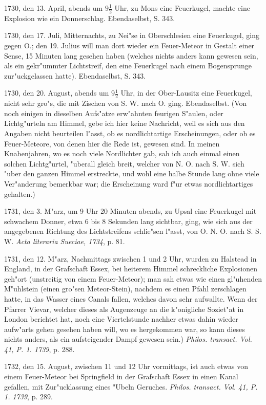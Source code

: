 \documentclass[a4paper, 11pt, oneside, polutonikogreek, german]{article}
\begin{document}
1730, den 13. April, abends um $\mathfrak{9\frac{1}{2}}$ Uhr, zu Mons eine Feuerkugel, machte eine Explosion wie ein Donnerschlag. Ebendaselbst, S. 343.

1730, den 17. Juli, Mitternachts, zu Nei"se in Oberschlesien eine Feuerkugel, ging gegen O.; den 19. Julius will man dort wieder ein Feuer-Meteor in Gestalt einer Sense, 15 Minuten lang gesehen haben (welches nichts anders kann gewesen sein, als ein gekr"ummter Lichtstreif, den eine Feuerkugel nach einem Bogensprunge zur"uckgelassen hatte). Ebendaselbst, S. 343.

1730, den 20. August, abends um $\mathfrak{9\frac{1}{2}}$ Uhr, in der Ober-Lausitz eine Feuerkugel, nicht sehr gro"s, die mit Zischen von S. W. nach O. ging. Ebendaselbst. (Von noch einigen in dieselben Aufs"atze erw"ahnten feurigen S"aulen, oder Lichtg"urteln am Himmel, gebe ich hier keine Nachricht, weil es sich aus den Angaben nicht beurteilen l"asst, ob es nordlichtartige Erscheinungen, oder ob es Feuer-Meteore, von denen hier die Rede ist, gewesen sind. In meinen Knabenjahren, wo es noch viele Nordlichter gab, sah ich auch einmal einen solchen Lichtg"urtel, "uberall gleich breit, welcher von N. O. nach S. W. sich "uber den ganzen Himmel erstreckte, und wohl eine halbe Stunde lang ohne viele Ver"anderung bemerkbar war; die Erscheinung ward f"ur etwas nordlichtartiges gehalten.)

1731, den 3. M"arz, um 9 Uhr 20 Minuten abends, zu Upsal eine Feuerkugel mit schwachem Donner, etwa 6 bis 8 Sekunden lang sichtbar, ging, wie sich aus der angegebenen Richtung des Lichtstreifens schlie"sen l"asst, von O. N. O. nach S. S. W. \emph{Acta literaria Sueciae, 1734}, p. 81.

1731, den 12. M"arz, Nachmittags zwischen 1 und 2 Uhr, wurden zu Halstead in England, in der Grafschaft Essex, bei heiterem Himmel schreckliche Explosionen geh"ort (unstreitig von einem Feuer-Meteor); man sah etwas wie einen gl"uhenden M"uhlstein (einen gro"sen Meteor-Stein), nachdem es einen Pfahl zerschlagen hatte, in das Wasser eines Canals fallen, welches davon sehr aufwallte. Wenn der Pfarrer Vievar, welcher dieses als Augenzeuge an die k"onigliche Soziet"at in London berichtet hat, noch eine Viertelstunde nachher etwas dahin wieder aufw"arts gehen gesehen haben will, wo es hergekommen war, so kann dieses nichts anders, als ein aufsteigender Dampf gewesen sein.) \emph{Philos. transact. Vol. 41, P. 1. 1739}, p. 288.

1732, den 15. August, zwischen 11 und 12 Uhr vormittags, ist auch etwas von einem Feuer-Meteor bei Springfield in der Grafschaft Essex in einen Kanal gefallen, mit Zur"ucklassung eines "Ubeln Geruches. \emph{Philos. transact. Vol. 41, P. 1. 1739}, p. 289.
\end{document}
